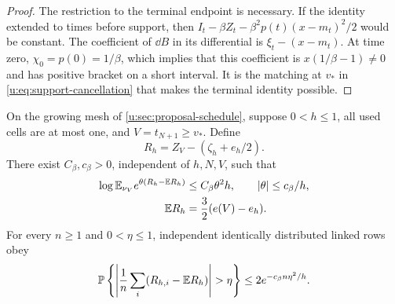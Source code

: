 \begin{proof}
The restriction to the terminal endpoint is necessary. If the identity extended to times before support, then $I_t-\beta Z_t-\beta^2p(t)(x-m_t)^2/2$ would be constant. The coefficient of $\dd B$ in its differential is $\xi_t-(x-m_t)$. At time zero, $\chi_0=p(0)=1/\beta$, which implies that this coefficient is $x(1/\beta-1)\ne0$ and has positive bracket on a short interval. It is the matching at $v_*$ in \eqref{u:eq:support-cancellation} that makes the terminal identity possible.
\end{proof}

\begin{lemma}\label{u:lem:lag}
On the growing mesh of \cref{u:sec:proposal-schedule}, suppose $0<h\le1$, all used cells are at most one, and $V=t_{N+1}\ge v_*$. Define
\[
 R_h=Z_V-(\zeta_h+e_h/2).
\]
There exist $C_\beta,c_\beta>0$, independent of $h,N,V$, such that
\begin{equation}\label{u:eq:residual-mgf}
\begin{aligned}
 \log\mathbb E_{\nu_V}e^{\theta(R_h-\mathbb E R_h)}
 &\le C_\beta\theta^2h,\qquad |\theta|\le c_\beta/h,\\
 \mathbb E R_h&=\frac32(e(V)-e_h).
\end{aligned}
\end{equation}
For every $n\ge1$ and $0<\eta\le1$, independent identically distributed linked rows obey
\begin{equation}\label{u:eq:residual-average-tail}
 \PP\left\{\left|\frac1n\sum_i(R_{h,i}-\E R_h)\right|>\eta\right\}
 \le2e^{-c_\beta n\eta^2/h}.
\end{equation}
\end{lemma}

